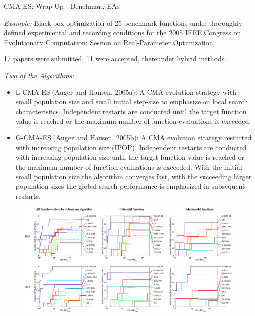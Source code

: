 \documentclass[11pt,compress,t,notes=noshow, xcolor=table]{beamer}
\begin{document}
\begin{vbframe}{CMA-ES: Wrap Up - Benchmark EAs}
\footnotesize{
\textit{Example:} Black-box optimization of 25 benchmark functions under thoroughly defined experimental and recording conditions for the 2005 IEEE Congress on Evolutionary Computation: Session on Real-Parameter Optimization.

17 papers were submitted, 11 were accepted, thereunder hybrid methods.

\lz

\textit{Two of the Algorithms:}
\begin{itemize}
\item L-CMA-ES (Auger and Hansen. 2005a): A CMA evolution strategy with small population size and small initial step-size to emphasize on local search characteristics. Independent restarts are conducted until the target function value is reached or the maximum number of function evaluations is exceeded.
\item G-CMA-ES (Auger and Hansen. 2005b): A CMA evolution strategy restarted with increasing population size (IPOP). Independent restarts are conducted with increasing population size until the target function value is reached or the maximum number of function evaluations is exceeded. With the initial small population size the algorithm converges fast, with the succeeding larger population sizes the global search performance is emphasized in subsequent restarts.
\end{itemize}
}

\framebreak

\begin{figure}
\includegraphics[width=1\textwidth, height=0.55\textheight]{figure_man/cmaes/cmaes_benchmark.png}
\end{figure}


\end{vbframe}
\end{document}
